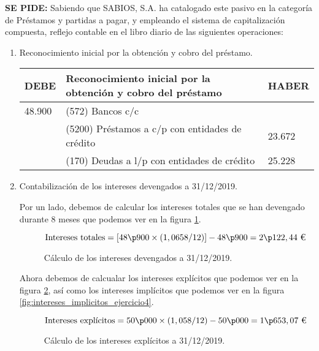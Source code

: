 \textbf{SE PIDE:} Sabiendo que SABIOS, S.A. ha catalogado este pasivo en la categoría de Préstamos y partidas a pagar, y empleando el sistema de capitalización compuesta, reflejo contable en el libro diario de las siguientes operaciones:
\begin{enumerate}[label=\alph*)]
\item Reconocimiento inicial por la obtención y cobro del préstamo.

\begin{table}[H]
\centering
\begin{tabular}{|p{2cm}|p{8cm}|p{2cm}|}
\hline
\rowcolor{blue!30}
\textbf{DEBE} & \textbf{Reconocimiento inicial por la obtención y cobro del préstamo} & \textbf{HABER} \\ \hline
48.900 & (572) Bancos c/c & \\ \hline
& (5200) Préstamos a c/p con entidades de crédito & 23.672 \\ \hline
& (170) Deudas a l/p con entidades de crédito & 25.228 \\ \hline
\end{tabular}
\end{table}

\item Contabilización de los intereses devengados a 31/12/2019.

Por un lado, debemos de calcular los intereses totales que se han devengado durante 8 meses que podemos ver en la figura \ref{fig:intereses_devengados_ejercicio4}.

\begin{figure}[H]
    \begin{equation*}
        \text{Intereses totales}  = \left[48\p900 \times (1,0658 / 12 )\right] - 48\p900 = 2\p122,44 \text{ €}
    \end{equation*}
    \caption{Cálculo de los intereses devengados a 31/12/2019.}
    \label{fig:intereses_devengados_ejercicio4}
\end{figure} 

Ahora debemos de calcualar los intereses explícitos que podemos ver en la figura \ref{fig:intereses_explicitos_ejercicio4}, así como los intereses implícitos que podemos ver en la figura \ref{fig:intereses_implicitos_ejercicio4}.
\begin{figure}[H]
    \begin{equation*}
        \text{Intereses explícitos} = 50\p000 \times (1,058 / 12) - 50\p000 = 1\p653,07 \text{ €}
    \end{equation*}
    \caption{Cálculo de los intereses explícitos a 31/12/2019.}
    \label{fig:intereses_explicitos_ejercicio4}
\end{figure}


\end{enumerate}
